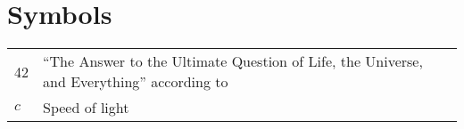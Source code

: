 \documentclass[master=elt,masteroption=eg,english]{kulemt}
\begin{document}
\section*{Symbols}
\begin{flushleft}
  \renewcommand{\arraystretch}{1.1}
  \begin{tabularx}{\textwidth}{@{}p{12mm}X@{}}
    42    & ``The Answer to the Ultimate Question of Life, the Universe,
            and Everything'' according to \cite{h2g2} \\
    $c$   & Speed of light \\
    
  \end{tabularx}
\end{flushleft}

\mainmatter









\appendixpage*          %
\appendix



\backmatter


%
\end{document}
